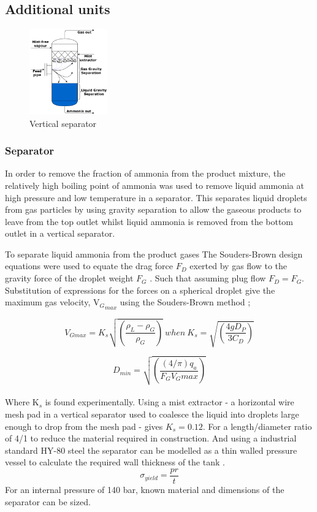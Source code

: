 \documentclass[11pt, a4paper]{article}
\begin{document}
{\subsection{Additional units}
\begin{figure}
	\centering
	\includegraphics[width=0.30\textwidth]{CondenserPRESENTATION}
	\caption{Vertical separator}
\end{figure}
\subsubsection{Separator}

In order to remove the fraction of ammonia from the product mixture, the relatively high boiling point of ammonia was used to remove liquid ammonia at high pressure and low temperature in a separator. This separates liquid droplets from gas particles by using gravity separation to allow the gaseous products to leave from the top outlet whilst liquid ammonia is removed from the bottom outlet in a vertical separator.

To separate liquid ammonia from the product gases The Souders-Brown design equations were used to equate the drag force $F_D$ exerted by gas flow to the gravity force of the droplet weight $F_G$ \cite{Campbell2015} \cite{Jekel2001}. Such that assuming plug flow $F_D = F_G$. Substitution of expressions for the forces on a spherical droplet give the maximum gas velocity, V${_G}_{max}$ using the Souders-Brown method \cite{Souders1934};

\begin{equation} V_{Gmax}=K_s\sqrt{ \left ( \frac{\rho_L - \rho_G}{\rho_G} \right )}\  when \  K_s = \sqrt{ \left ( \frac{4gD_P}{3C_D} \right )} \end{equation}

\begin{equation}D_{min} = \sqrt{\left ( \frac{(4/\pi)q_a}{F_GV_Gmax} \right ) } \end{equation}
\\ 
Where K$_s$ is found experimentally. Using a mist extractor - a horizontal wire mesh pad in a vertical separator used to coalesce the liquid into droplets large enough to drop from the mesh pad - gives $K_s = 0.12$. For a length/diameter ratio of 4/1 to reduce the material required in construction. And using a industrial standard HY-80 steel the separator can be modelled as a thin walled pressure vessel to calculate the required wall thickness of the tank \cite{Howatson1972}.
\begin{equation}
	\sigma_{yield}=\frac{pr}{t}
\end{equation}
For an internal pressure of 140 bar, known material and dimensions of the separator can be sized.

}
\end{document}
